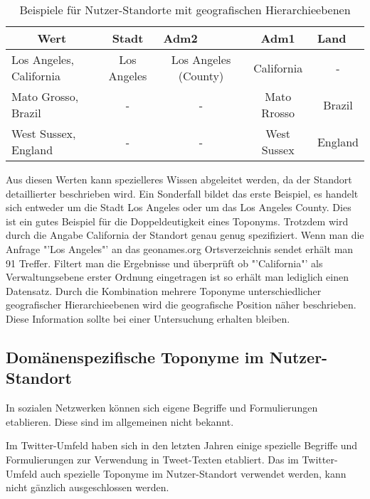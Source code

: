 			\begin{table}[h]
			\centering
			\caption{Beispiele für Nutzer-Standorte mit geografischen Hierarchieebenen}
			\label{my-label}
			\begin{tabular}{|l|c|c|c|c|}
			\hline
			\multicolumn{1}{|c|}{Wert} & Stadt       & \multicolumn{1}{l|}{Adm2} & Adm1 & \multicolumn{1}{l|}{Land} \\ \hline
			Los Angeles, California    & Los Angeles & Los Angeles (County)                                  & California                      & -                         \\ \hline
			Mato Grosso, Brazil        & -           & -                                                     & Mato Rrosso                     & Brazil                    \\ \hline
			West Sussex, England       & -           & -                                                     & West Sussex                     & England                   \\ \hline
			\end{tabular}
			\end{table}


			Aus diesen Werten kann spezielleres Wissen abgeleitet werden, da der Standort detaillierter beschrieben wird.
			Ein Sonderfall bildet das erste Beispiel, es handelt sich entweder um die Stadt Los Angeles oder um das Los Angeles County.
			Dies ist ein gutes Beispiel für die Doppeldeutigkeit eines Toponyms.
			Trotzdem wird durch die Angabe California der Standort genau genug spezifiziert. 
			Wenn man die Anfrage "'Los Angeles"' an das geonames.org Ortsverzeichnis sendet erhält man 91 Treffer. 
			Filtert man die Ergebnisse und überprüft ob "'California"' als Verwaltungsebene erster Ordnung eingetragen ist so erhält man lediglich einen Datensatz.  
			Durch die Kombination mehrere Toponyme unterschiedlicher geografischer Hierarchieebenen wird die geografische Position näher beschrieben.
			Diese Information sollte bei einer Untersuchung erhalten bleiben.
			
		\subsection{Domänenspezifische Toponyme im Nutzer-Standort} 

			In sozialen Netzwerken können sich eigene Begriffe und Formulierungen etablieren. 
			Diese sind im allgemeinen nicht bekannt.

			Im Twitter-Umfeld haben sich in den letzten Jahren einige spezielle Begriffe und Formulierungen zur Verwendung in Tweet-Texten etabliert. 
			Das im Twitter-Umfeld auch spezielle Toponyme im Nutzer-Standort verwendet werden, kann nicht gänzlich ausgeschlossen werden. 

